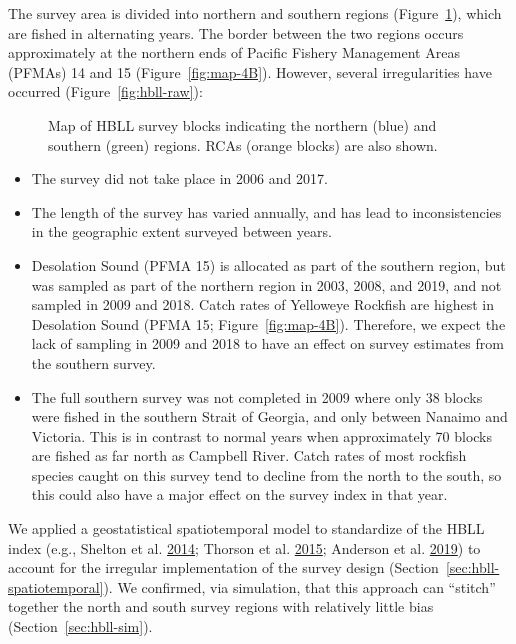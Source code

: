 \documentclass[11pt]{book}
\begin{document}
The survey area is divided into northern and southern regions (Figure~\ref{fig:map-HBLL-NS}), which are fished in alternating years. The border between the two regions occurs approximately at the northern ends of Pacific Fishery Management Areas (PFMAs) 14 and 15 (Figure~\ref{fig:map-4B}). However, several irregularities have occurred (Figure~\ref{fig:hbll-raw}):


\begin{figure}[htb]

{\centering {} 

}

\caption{Map of HBLL survey blocks indicating the northern (blue) and southern (green) regions. RCAs (orange blocks) are also shown.}\label{fig:map-HBLL-NS}
\end{figure}
\begin{itemize}

\item
  The survey did not take place in 2006 and 2017.
\item
  The length of the survey has varied annually, and has lead to inconsistencies in the geographic extent surveyed between years.
\item
  Desolation Sound (PFMA 15) is allocated as part of the southern region, but was sampled as part of the northern region in 2003, 2008, and 2019, and not sampled in 2009 and 2018. Catch rates of Yelloweye Rockfish are highest in Desolation Sound (PFMA 15; Figure~\ref{fig:map-4B}). Therefore, we expect the lack of sampling in 2009 and 2018 to have an effect on survey estimates from the southern survey.
\item
  The full southern survey was not completed in 2009 where only 38 blocks were fished in the southern Strait of Georgia, and only between Nanaimo and Victoria. This is in contrast to normal years when approximately 70 blocks are fished as far north as Campbell River. Catch rates of most rockfish species caught on this survey tend to decline from the north to the south, so this could also have a major effect on the survey index in that year.
\end{itemize}
We applied a geostatistical spatiotemporal model to standardize of the HBLL index (e.g., Shelton et al. \protect\hyperlink{ref-shelton2014}{2014}; Thorson et al. \protect\hyperlink{ref-thorson2015}{2015}; Anderson et al. \protect\hyperlink{ref-anderson2019synopsis}{2019}) to account for the irregular implementation of the survey design (Section~\ref{sec:hbll-spatiotemporal}). We confirmed, via simulation, that this approach can ``stitch'' together the north and south survey regions with relatively little bias (Section~\ref{sec:hbll-sim}).
\end{document}
